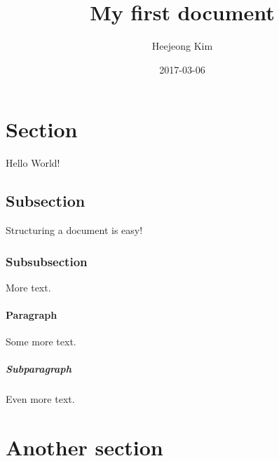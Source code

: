\documentclass{article}
\title{My first document}
\date{2017-03-06}
\author{Heejeong Kim}
\begin{document}
\maketitle
\newpage
{}

\section{Section}
Hello World!

\subsection{Subsection}
Structuring a document is easy!

\subsubsection{Subsubsection}
More text.

\paragraph{Paragraph}
Some more text.

\subparagraph{Subparagraph}
Even more text.

\section{Another section}
\end{document}

